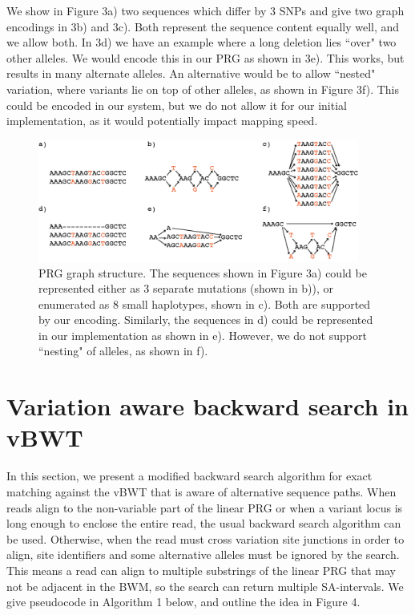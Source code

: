 \documentclass[runningheads,a4paper]{llncs}
\begin{document}
We show in Figure 3a) two sequences which differ by 3 SNPs and give two graph encodings in 3b) and 3c). Both represent the sequence content equally well, and we allow both.
In 3d) we have an example where a long deletion lies ``over" two other alleles. We would encode this in our PRG as shown in 3e). This works, but results in many alternate alleles. An alternative would be to allow ``nested" variation, where variants lie on top of other alleles, as shown in Figure 3f). This could be encoded in our system, but we do not allow it for our initial implementation, as it would potentially impact mapping speed. 

\begin{figure}
\centering
\includegraphics[height=4cm]{graph_construction.png}
\caption{PRG graph structure. The sequences shown in Figure 3a) could be represented either as 3 separate mutations (shown in b)), or enumerated as 8 small haplotypes, shown in c). Both are supported by our encoding. Similarly, the sequences in d) could be represented in our implementation as shown in e). However, we do not support ``nesting" of alleles, as shown in f).}
\label{lab}
\end{figure}






\section{Variation aware backward search in vBWT}

In this section, we present a modified backward search algorithm for exact matching against the vBWT that is aware of alternative sequence paths. When reads align to the non-variable part of the linear PRG or when a variant locus is long enough to enclose the entire read, the usual backward search algorithm can be used. Otherwise, when the read must cross variation site junctions in order to align, site identifiers and some alternative alleles must be ignored by the search. This means a read can align to multiple substrings of the linear PRG that may not be adjacent in the BWM, so the search can return multiple SA-intervals. We give pseudocode in Algorithm 1 below, and outline the idea in Figure 4.
\end{document}
